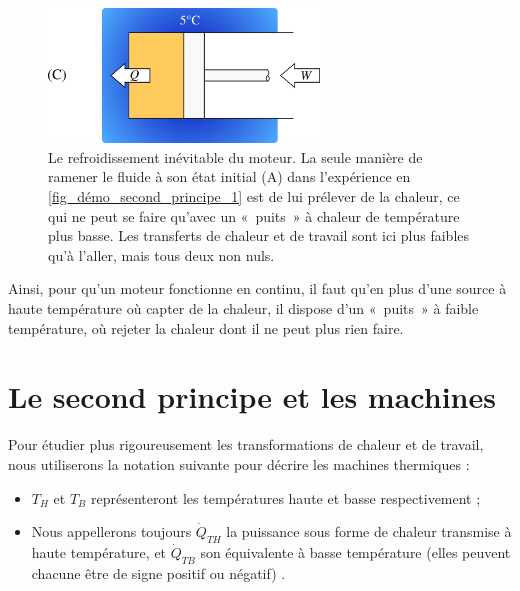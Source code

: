 		\begin{figure}
			\begin{center}
				\includegraphics[width=7.2cm]{images/demo_second_principe_2.png}
			\end{center}
			\caption{Le refroidissement inévitable du moteur.
		La seule manière de ramener le fluide à son état initial (A) dans l’expérience en \cref{fig_démo_second_principe_1} est de lui prélever de la chaleur, ce qui ne peut se faire qu’avec un «~puits~» à chaleur de température plus basse. Les transferts de chaleur et de travail sont ici plus faibles qu’à l’aller, mais tous deux non nuls.}
			\label{fig_démo_second_principe_2}
		\end{figure}

		Ainsi, pour qu’un moteur fonctionne en continu, il faut qu’en plus d’une source à haute température où capter de la chaleur, il dispose d’un «~puits~» à faible température, où rejeter la chaleur dont il ne peut plus rien faire.


\section{Le second principe et les machines}
\label{ch_second_principe_appliqué_machines}


	Pour étudier plus rigoureusement les transformations de chaleur et de travail, nous utiliserons la notation suivante pour décrire les machines thermiques :

	\begin{itemize}
		\item $T_H$ et $T_B$ représenteront les températures haute et basse respectivement ;
		\item Nous appellerons toujours $\dot{Q}_{TH}$ la puissance sous forme de chaleur transmise à haute température, et $\dot{Q}_{TB}$ son équivalente à basse température (elles peuvent chacune être de signe positif ou négatif)
		.
	\end{itemize}

